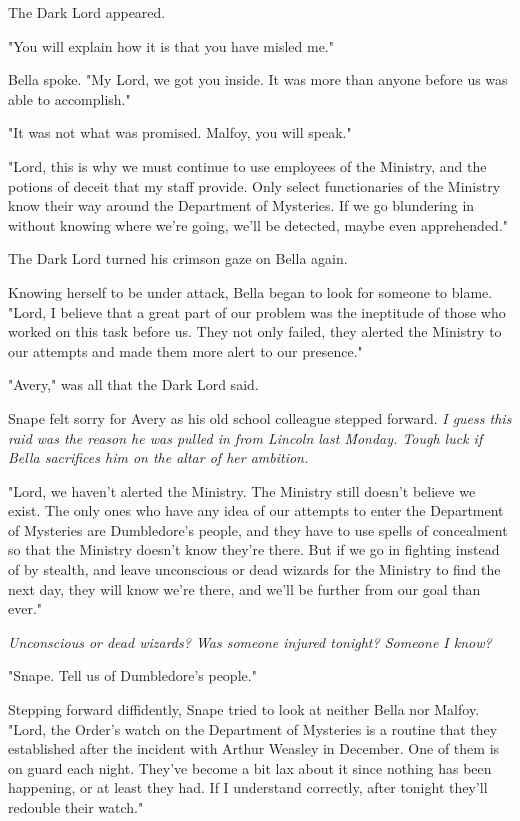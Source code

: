 \documentclass[a4paper,11pt]{article}
\begin{document}
The Dark Lord appeared.

"You will explain how it is that you have misled me."

Bella spoke. "My Lord, we got you inside. It was more than anyone before us was able to accomplish."

"It was not what was promised. Malfoy, you will speak."

"Lord, this is why we must continue to use employees of the Ministry, and the potions of deceit that my staff provide. Only select functionaries of the Ministry know their way around the Department of Mysteries. If we go blundering in without knowing where we're going, we'll be detected, maybe even apprehended."

The Dark Lord turned his crimson gaze on Bella again.

Knowing herself to be under attack, Bella began to look for someone to blame. "Lord, I believe that a great part of our problem was the ineptitude of those who worked on this task before us. They not only failed, they alerted the Ministry to our attempts and made them more alert to our presence."

"Avery," was all that the Dark Lord said.

Snape felt sorry for Avery as his old school colleague stepped forward. \emph{I guess this raid was the reason he was pulled in from Lincoln last Monday. Tough luck if Bella sacrifices him on the altar of her ambition.}

"Lord, we haven't alerted the Ministry. The Ministry still doesn't believe we exist. The only ones who have any idea of our attempts to enter the Department of Mysteries are Dumbledore's people, and they have to use spells of concealment so that the Ministry doesn't know they're there. But if we go in fighting instead of by stealth, and leave unconscious or dead wizards for the Ministry to find the next day, they will know we're there, and we'll be further from our goal than ever."

\emph{Unconscious or dead wizards? Was someone injured tonight? Someone I know?}

"Snape. Tell us of Dumbledore's people."

Stepping forward diffidently, Snape tried to look at neither Bella nor Malfoy. "Lord, the Order's watch on the Department of Mysteries is a routine that they established after the incident with Arthur Weasley in December. One of them is on guard each night. They've become a bit lax about it since nothing has been happening, or at least they had. If I understand correctly, after tonight they'll redouble their watch."
\end{document}
